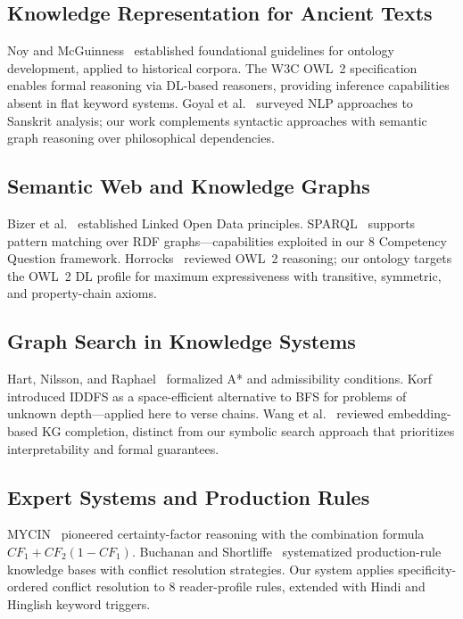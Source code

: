 \documentclass[conference]{IEEEtran}
\begin{document}
\subsection{Knowledge Representation for Ancient Texts}

Noy and McGuinness~\cite{noy2001ontology} established foundational guidelines
for ontology development, applied to historical corpora. The W3C OWL~2
specification~\cite{mcguinness2004owl} enables formal reasoning via DL-based
reasoners, providing inference capabilities absent in flat keyword systems.
Goyal et al.~\cite{goyal2012sanskrit} surveyed NLP approaches to Sanskrit
analysis; our work complements syntactic approaches with semantic graph
reasoning over philosophical dependencies.

\subsection{Semantic Web and Knowledge Graphs}

Bizer et al.~\cite{bizer2009linked} established Linked Open Data principles.
SPARQL~\cite{harris2013sparql} supports pattern matching over RDF
graphs—capabilities exploited in our 8 Competency Question framework.
Horrocks~\cite{horrocks2008ontologies} reviewed OWL~2 reasoning; our
ontology targets the OWL~2 DL profile for maximum expressiveness with
transitive, symmetric, and property-chain axioms.

\subsection{Graph Search in Knowledge Systems}

Hart, Nilsson, and Raphael~\cite{hart1968formal} formalized A* and admissibility
conditions. Korf~\cite{korf1985depth} introduced IDDFS as a space-efficient
alternative to BFS for problems of unknown depth—applied here to verse chains.
Wang et al.~\cite{wang2014knowledge} reviewed embedding-based KG completion,
distinct from our symbolic search approach that prioritizes interpretability
and formal guarantees.

\subsection{Expert Systems and Production Rules}

MYCIN~\cite{shortliffe1976computer} pioneered certainty-factor reasoning with
the combination formula $CF_1 + CF_2(1-CF_1)$. Buchanan and
Shortliffe~\cite{buchanan1984rule} systematized production-rule knowledge bases
with conflict resolution strategies. Our system applies specificity-ordered
conflict resolution to 8 reader-profile rules, extended with Hindi and
Hinglish keyword triggers.
\end{document}
